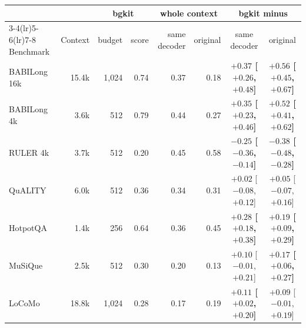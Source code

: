 \begin{tabular}{lrrrrrcc}
\toprule
 & & \multicolumn{2}{c}{bgkit} & \multicolumn{2}{c}{whole context} & \multicolumn{2}{c}{bgkit minus} \\
\cmidrule(lr){3-4}\cmidrule(lr){5-6}\cmidrule(lr){7-8}
Benchmark & Context & budget & score & same decoder & original & same decoder & original \\
\midrule
BABILong 16k & 15.4k & 1,024 & 0.74 & 0.37 & 0.18 & \textbf{$+0.37$ \scriptsize[$+0.26$, $+0.48$]} & \textbf{$+0.56$ \scriptsize[$+0.45$, $+0.67$]} \\
BABILong 4k & 3.6k & 512 & 0.79 & 0.44 & 0.27 & \textbf{$+0.35$ \scriptsize[$+0.23$, $+0.46$]} & \textbf{$+0.52$ \scriptsize[$+0.41$, $+0.62$]} \\
RULER 4k & 3.7k & 512 & 0.20 & 0.45 & 0.58 & \textbf{$-0.25$ \scriptsize[$-0.36$, $-0.14$]} & \textbf{$-0.38$ \scriptsize[$-0.48$, $-0.28$]} \\
QuALITY & 6.0k & 512 & 0.36 & 0.34 & 0.31 & $+0.02$ \scriptsize[$-0.08$, $+0.12$] & $+0.05$ \scriptsize[$-0.07$, $+0.16$] \\
HotpotQA & 1.4k & 256 & 0.64 & 0.36 & 0.45 & \textbf{$+0.28$ \scriptsize[$+0.18$, $+0.38$]} & \textbf{$+0.19$ \scriptsize[$+0.09$, $+0.29$]} \\
MuSiQue & 2.5k & 512 & 0.30 & 0.20 & 0.13 & $+0.10$ \scriptsize[$-0.01$, $+0.21$] & \textbf{$+0.17$ \scriptsize[$+0.06$, $+0.27$]} \\
LoCoMo & 18.8k & 1,024 & 0.28 & 0.17 & 0.19 & \textbf{$+0.11$ \scriptsize[$+0.02$, $+0.20$]} & $+0.09$ \scriptsize[$-0.01$, $+0.19$] \\
\bottomrule
\end{tabular}
